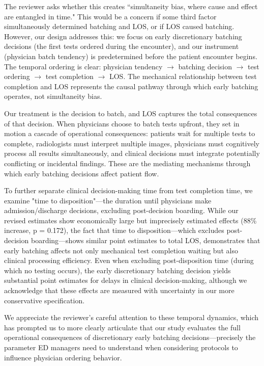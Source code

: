 \documentclass[11pt]{article}
\newcommand{\1}{\hbox{\rm 1\kern-.35em 1}}
\begin{document}
The reviewer asks whether this creates ``simultaneity bias, where cause and effect are entangled in time." This would be a concern if some third factor simultaneously determined batching and LOS, or if LOS caused batching. However, our design addresses this: we focus on early discretionary batching decisions (the first tests ordered during the encounter), and our instrument (physician batch tendency) is predetermined before the patient encounter begins. The temporal ordering is clear: physician tendency $\rightarrow$ batching decision $\rightarrow$ test ordering $\rightarrow$ test completion $\rightarrow$ LOS. The mechanical relationship between test completion and LOS represents the causal pathway through which early batching operates, not simultaneity bias.

Our treatment is the decision to batch, and LOS captures the total consequences of that decision. When physicians choose to batch tests upfront, they set in motion a cascade of operational consequences: patients wait for multiple tests to complete, radiologists must interpret multiple images, physicians must cognitively process all results simultaneously, and clinical decisions must integrate potentially conflicting or incidental findings. These are the mediating mechanisms through which early batching decisions affect patient flow.

To further separate clinical decision-making time from test completion time, we examine "time to disposition"—the duration until physicians make admission/discharge decisions, excluding post-decision boarding. While our revised estimates show economically large but imprecisely estimated effects (88\% increase, p = 0.172), the fact that time to disposition—which excludes post-decision boarding—shows similar point estimates to total LOS, demonstrates that early batching affects not only mechanical test completion waiting but also clinical processing efficiency. Even when excluding post-disposition time (during which no testing occurs), the early discretionary batching decision yields substantial point estimates for delays in clinical decision-making, although we acknowledge that these effects are measured with uncertainty in our more conservative specification.

We appreciate the reviewer's careful attention to these temporal dynamics, which has prompted us to more clearly articulate that our study evaluates the full operational consequences of discretionary early batching decisions—precisely the parameter ED managers need to understand when considering protocols to influence physician ordering behavior.
\end{document}
